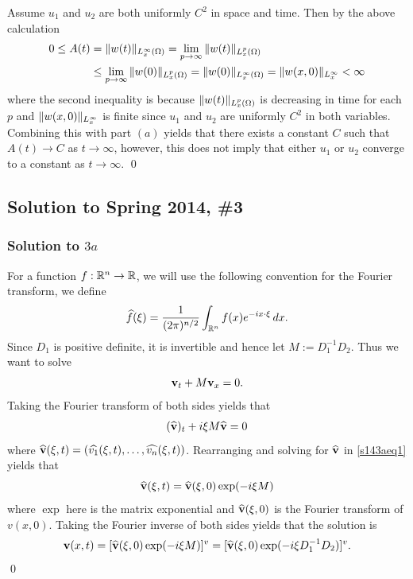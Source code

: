 Assume $u_{1}$ and $u_{2}$ are both uniformly $C^{2}$ in space and time. Then by the above calculation
\begin{align*}
0 \leq A(t) &= \| w(t) \|_{L_{x}^{\infty}(\Omega)} = \lim_{p \rightarrow \infty}\| w(t) \|_{L_{x}^{p}(\Omega)}\\
 &\leq \lim_{p \rightarrow \infty}\| w(0) \|_{L_{x}^{p}(\Omega)} = \| w(0) \|_{L_{x}^{\infty}(\Omega)} = \| w(x, 0) \|_{L_{x}^{\infty}} < \infty
\end{align*}
where the second inequality is because $\| w(t) \|_{L_{x}^{p}(\Omega)}$ is decreasing in time for each $p$
and $\| w(x, 0) \|_{L_{x}^{\infty}}$ is finite since $u_{1}$ and $u_{2}$ are uniformly $C^{2}$ in both variables. Combining this with part $(a)$ yields that there exists
a constant $C$ such that $A(t) \rightarrow C$ as $t \rightarrow \infty$, however, this does not imply that either $u_{1}$ or $u_{2}$ converge to a constant
as $t \rightarrow \infty$.
\hfill\qed

\subsection*{Solution to Spring 2014, \#3}\label{s143}
\subsubsection*{Solution to $3a$}
For a function $f: \mathbb{R}^{n} \rightarrow \mathbb{R}$, we will use the following convention for the Fourier transform, we define
$$\widehat{f}(\xi) = \frac{1}{(2\pi)^{n/2}}\int_{\mathbb{R}^{n}}f(x)e^{-ix\cdot \xi}\, dx.$$
Since $D_{1}$ is positive definite, it is invertible and hence let $M := D_{1}^{-1}D_{2}$. Thus we want to solve
$$\mathbf{v}_{t} + M\mathbf{v}_{x} = 0.$$
Taking the Fourier transform of both sides yields that
\begin{align}\label{s143aeq1}
(\widehat{\mathbf{v}})_{t} + i\xi M\widehat{\mathbf{v}} = 0
\end{align}
where $\widehat{\mathbf{v}}(\xi, t) = (\widehat{v_{1}}(\xi, t), \ldots, \widehat{v_{n}}(\xi, t))$. Rearranging and solving for $\widehat{\mathbf{v}}$ in \eqref{s143aeq1}
yields that
$$\widehat{\mathbf{v}}(\xi, t) = \widehat{\mathbf{v}}(\xi, 0)\exp(-i\xi M)$$
where $\exp$ here is the matrix exponential and $\widehat{\mathbf{v}}(\xi, 0)$ is the Fourier transform
of $v(x, 0)$. Taking the Fourier inverse of both sides yields that the solution is
$$\mathbf{v}(x, t) = [\widehat{\mathbf{v}}(\xi, 0)\exp(-i\xi M)]^{v} = [\widehat{\mathbf{v}}(\xi, 0)\exp(-i\xi D_{1}^{-1}D_{2})]^{v}.$$
\hfill\qed

